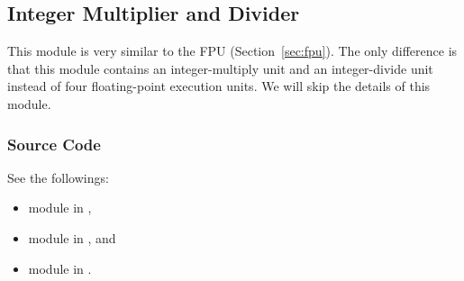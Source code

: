 \subsection{Integer Multiplier and Divider}

This module is very similar to the FPU (Section~\ref{sec:fpu}).
The only difference is that this module contains an integer-multiply unit and an integer-divide unit instead of four floating-point execution units.
We will skip the details of this module.

\subsubsection{Source Code}
See the followings:
\begin{itemize}
    \item module  in ,
    \item module  in , and
    \item module  in .
\end{itemize}
